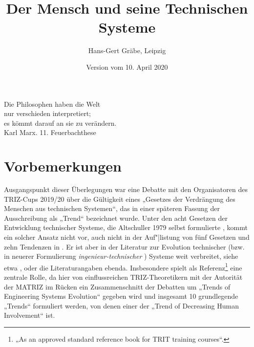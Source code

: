 \documentclass[11pt,a4paper]{article}
\title{Der Mensch und seine Technischen Systeme}
\author{Hans-Gert Gräbe, Leipzig}
\date{Version vom 10. April 2020}
\begin{document}
\maketitle

\begin{flushright}
  Die Philosophen haben die Welt\\ nur verschieden interpretiert;\\ es kömmt
  darauf an sie zu verändern.\\ Karl Marx. 11. Feuerbachthese
\end{flushright}
\section{Vorbemerkungen}

Ausgangspunkt dieser Überlegungen war eine Debatte mit den Organisatoren des
TRIZ-Cups 2019/20 über die Gültigkeit eines „Gesetzes der Verdrängung des
Menschen aus technischen Systemen“, das in einer späteren Fassung der
Ausschreibung als „Trend“ bezeichnet wurde. Unter den acht Gesetzen der
Entwicklung technischer Systeme, die Altschuller 1979 selbst formulierte
\cite[S. 2]{TESE2018}, kommt ein solcher Ansatz nicht vor, auch nicht in der
Auf"|listung von fünf Gesetzen und zehn Tendenzen in
\cite[S. 148\,ff.]{KoltzeSouchkov2017}.  Er ist aber in der Literatur zur
Evolution technischer (bzw. in neuerer Formulierung
\emph{ingenieur-technischer} \cite{TESE2018}) Systeme weit verbreitet, siehe
etwa \cite[2.24]{Goldovsky1983}, \cite{TESE2018} oder die Literaturangaben
ebenda.  Insbesondere \cite{TESE2018} spielt als Referenz\footnote{„As an
  approved standard reference book for TRIT training courses“.} eine zentrale
Rolle, da hier von einflussreichen TRIZ-Theoretikern mit der Autorität der
MATRIZ im Rücken ein Zusammenschnitt der Debatten um „Trends of Engineering
Systems Evolution“ gegeben wird und insgesamt 10 grundlegende „Trends“
formuliert werden, von denen einer der „Trend of Decreasing Human Involvement“
\cite[4.8]{TESE2018} ist.
\end{document}
